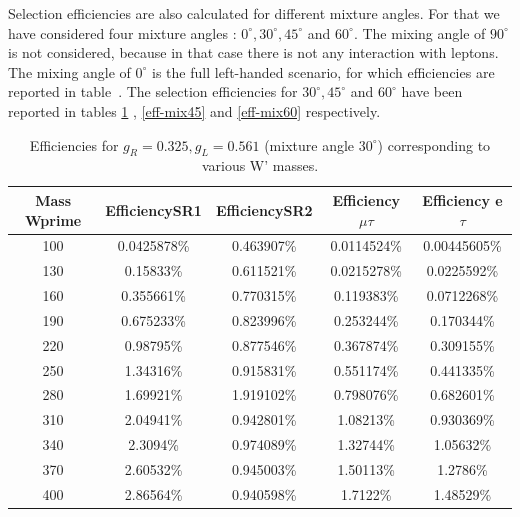 Selection efficiencies are also calculated for different mixture angles. For that we have considered four mixture angles : $0^\circ, 30^\circ, 45^\circ$ and $60^\circ$. The mixing angle of $90^\circ$ is not considered, because in that case there is not any interaction with leptons. The mixing angle of $0^\circ$ is the full left-handed scenario, for which efficiencies are reported in table~\label{eff-SM}.  The selection efficiencies for  $30^\circ, 45^\circ$ and $60^\circ$ have been reported in tables \ref{eff-mix30} , \ref{eff-mix45} and \ref{eff-mix60} respectively.

 \begin{table}[htb]
 	\centering
  	\begin{tabular}{|ccccc|}
  		\hline 
  		Mass Wprime & EfficiencySR1 & EfficiencySR2 & Efficiency $\mu$$\tau$ & Efficiency e $\tau$ \\
\hline 
  		100&0.0425878\%&0.463907\%&0.0114524\%&0.00445605\%\\
        	130& 0.15833\%& 0.611521\%& 0.0215278\%& 0.0225592\%\\
        	160&0.355661\%&0.770315\%&0.119383\%&0.0712268\%\\
          	190& 0.675233\%& 0.823996\%& 0.253244\%& 0.170344\%\\
                220&0.98795\%&0.877546\%&0.367874\%&0.309155\%\\
                250&1.34316\%&0.915831\%&0.551174\%&0.441335\%\\ 
          	280& 1.69921\%& 1.919102\%& 0.798076\%& 0.682601\%\\
                310&2.04941\%&0.942801\%&1.08213\%&0.930369\%\\
                340& 2.3094\%& 0.974089\%& 1.32744\%& 1.05632\%\\ 
                370& 2.60532\%& 0.945003\%& 1.50113\%& 1.2786\%\\
        	400& 2.86564\%&0.940598\%&1.7122\%&1.48529\%\\

  		\hline
  	\end{tabular}
  	\caption{Efficiencies for  $ g_R=0.325, g_L=0.561  $ (mixture angle $30^\circ$) corresponding to various W' masses. \label{eff-mix30} }
  \end{table}

